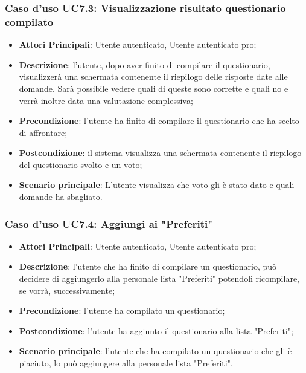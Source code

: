 \subsubsection{Caso d'uso UC7.3: Visualizzazione risultato questionario compilato}
\begin{itemize}
\item\textbf{Attori Principali}: Utente autenticato, Utente autenticato pro;
\item\textbf{Descrizione}: l'utente, dopo aver finito di compilare il questionario, visualizzerà una schermata contenente il riepilogo delle risposte date alle domande. Sarà possibile vedere quali di queste sono corrette e quali no e verrà inoltre data una valutazione complessiva;
\item\textbf{Precondizione}: l'utente ha finito di compilare il questionario che ha scelto di affrontare;
\item\textbf{Postcondizione}: il sistema visualizza una schermata contenente il riepilogo del questionario svolto e un voto;
\item\textbf{Scenario principale}: L'utente visualizza che voto gli è stato dato e quali domande ha sbagliato.
\end{itemize}

\subsubsection{Caso d'uso UC7.4: Aggiungi ai "Preferiti"}
\begin{itemize}
\item\textbf{Attori Principali}: Utente autenticato, Utente autenticato pro;
\item\textbf{Descrizione}: l'utente che ha finito di compilare un questionario, può decidere di aggiungerlo alla personale lista "Preferiti" potendoli ricompilare, se vorrà, successivamente;
\item\textbf{Precondizione}: l'utente ha compilato un questionario;
\item\textbf{Postcondizione}: l'utente ha aggiunto il questionario alla lista "Preferiti";
\item\textbf{Scenario principale}: l'utente che ha compilato un questionario che gli è piaciuto, lo può aggiungere alla personale lista "Preferiti".
\end{itemize}

